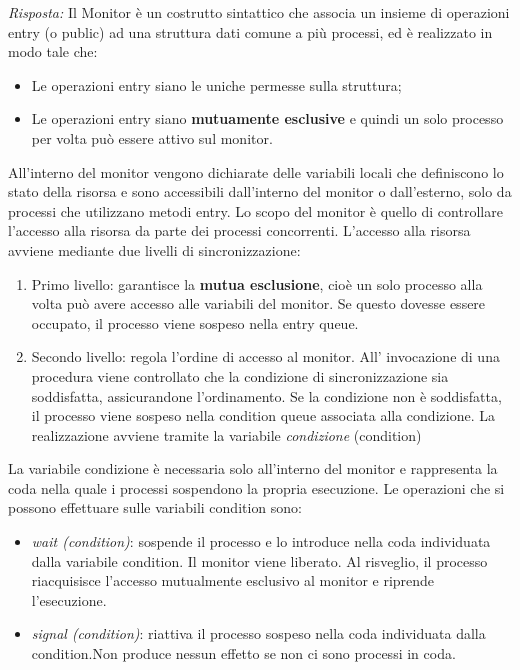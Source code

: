 \documentclass{article}
\newenvironment{solution}
    {\textit{Risposta:}}
    {}
\begin{document}
\begin{solution}
Il Monitor è un costrutto sintattico che associa un insieme di operazioni entry (o public) ad una struttura dati comune a più processi, ed è realizzato in modo tale che:
\begin{itemize}
    \item Le operazioni entry siano le uniche permesse sulla struttura;
    \item Le operazioni entry siano \textbf{mutuamente esclusive} e quindi un solo processo per volta può essere attivo sul monitor.
\end{itemize}
All’interno del monitor vengono dichiarate delle variabili locali che definiscono lo stato della risorsa e sono accessibili dall’interno del monitor o dall’esterno, solo da processi che utilizzano metodi entry.
\newline
Lo scopo del monitor è quello di controllare l’accesso alla risorsa da parte dei processi concorrenti.  
\newline
\newline
L’accesso alla risorsa avviene mediante due livelli di sincronizzazione:  
\begin{enumerate}
    \item Primo livello: garantisce la \textbf{mutua esclusione}, cioè un solo processo alla volta può avere accesso alle variabili del monitor. Se questo dovesse essere occupato, il processo viene sospeso nella entry queue. 
    \item Secondo livello: regola l’ordine di accesso al monitor. All' invocazione di una procedura viene controllato che la condizione di sincronizzazione sia soddisfatta, assicurandone l’ordinamento.
    \newline
    Se la condizione non è soddisfatta, il processo viene sospeso nella condition queue associata alla condizione.
    \newline
    La realizzazione avviene tramite la variabile \textit{condizione} (condition) 
\end{enumerate}
La variabile condizione è necessaria solo all’interno del monitor e rappresenta la coda nella quale i processi sospendono la propria esecuzione.
\newline
Le operazioni che si possono effettuare sulle variabili condition sono:
\begin{itemize}
    \item \emph{wait (condition)}: sospende il processo e lo introduce nella coda individuata dalla variabile condition. Il monitor viene liberato. Al risveglio, il processo riacquisisce l’accesso mutualmente esclusivo al monitor e riprende l’esecuzione.
    \item \emph{signal (condition)}: riattiva il processo sospeso nella coda individuata dalla condition.\newline Non produce nessun effetto se non ci sono processi in coda.
\end{itemize}
\end{solution}
\end{document}
